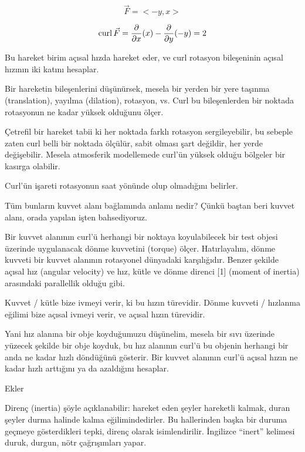 \documentclass[12pt,fleqn]{article}\usepackage{../../common}
\begin{document}
$$ \vec{F} = <-y,x> $$

$$
\operatorname{curl} \vec{F} =
\frac{\partial }{\partial x}(x) -
\frac{\partial }{\partial y}(-y) = 2
$$

Bu hareket birim açısal hızda hareket eder, ve curl rotasyon bileşeninin açısal
hızının iki katını hesaplar.

Bir hareketin bileşenlerini düşünürsek, mesela bir yerden bir yere taşınma
(translation), yayılma (dilation), rotasyon, vs. Curl bu bileşenlerden bir
noktada rotasyonun ne kadar yüksek olduğunu ölçer.

Çetrefil bir hareket tabii ki her noktada farklı rotasyon sergileyebilir, bu
sebeple zaten curl belli bir noktada ölçülür, sabit olması şart değildir, her
yerde değişebilir. Mesela atmosferik modellemede curl'ün yüksek olduğu bölgeler
bir kasırga olabilir.

Curl'ün işareti rotasyonun saat yönünde olup olmadığını belirler. 

Tüm bunların kuvvet alanı bağlamında anlamı nedir? Çünkü baştan beri kuvvet
alanı, orada yapılan işten bahsediyoruz.

Bir kuvvet alanının curl'ü herhangi bir noktaya koyulabilecek bir test objesi
üzerinde uygulanacak dönme kuvvetini (torque) ölçer. Hatırlayalım, dönme kuvveti
bir kuvvet alanının rotasyonel dünyadaki karşılığıdır. Benzer şekilde açısal hız
(angular velocity) ve hız, kütle ve dönme direnci [1] (moment of inertia)
arasındaki parallellik olduğu gibi.

Kuvvet / kütle bize ivmeyi verir, ki bu hızın türevidir. Dönme kuvveti /
hızlanma eğilimi bize açısal ivmeyi verir, ve açısal hızın türevidir.

Yani hız alanına bir obje koyduğumuzu düşünelim, mesela bir sıvı üzerinde
yüzecek şekilde bir obje koyduk, bu hız alanının curl'ü bu objenin herhangi bir
anda ne kadar hızlı döndüğünü gösterir. Bir kuvvet alanının curl'ü açısal hızın
ne kadar hızlı arttığını ya da azaldığını hesaplar.

Ekler

Direnç (inertia) şöyle açıklanabilir: hareket eden şeyler hareketli kalmak,
duran şeyler durma halinde kalma eğilimindedirler. Bu hallerinden başka bir
duruma geçmeye gösterdikleri tepki, direnç olarak isimlendirilir. İngilizce
``inert'' kelimesi duruk, durgun, nötr çağrışımları yapar.
\end{document}
